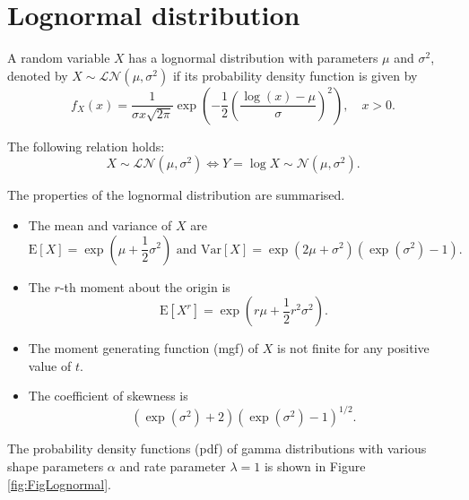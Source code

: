 \documentclass[landscape, 20pt]{extreport}
\theoremstyle{definition}
\theoremstyle{definition}
\theoremstyle{definition}
\theoremstyle{definition}
\theoremstyle{remark}
\begin{document}
\hypertarget{lognormal-distribution}{%
\section{Lognormal distribution}\label{lognormal-distribution}}

A random variable \(X\) has a lognormal distribution with parameters \(\mu\)
and \(\sigma^2\), denoted by \(X \sim \mathcal{LN}(\mu, \sigma^2)\) if its
probability density function is given by
\[f_X(x) = \frac{1}{\sigma x \sqrt{2 \pi}} \exp\left(-\frac{1}{2} \left( \frac{\log(x) - \mu}{\sigma} \right)^2 \right) , \quad x > 0.\]

The following relation holds:
\[X \sim \mathcal{LN}(\mu, \sigma^2)\Leftrightarrow Y = \log X \sim \mathcal{N}(\mu, \sigma^2).\]

The properties of the lognormal distribution are summarised.

\begin{itemize}
\item
  The mean and variance of \(X\) are
  \[\mathrm{E}[X] = \exp\left(\mu + \frac{1}{2} \sigma^2 \right) \text{ and } \mathrm{Var}[X] =\exp\left(2\mu +  \sigma^2 \right) (\exp(\sigma^2) - 1).\]
\item
  The \(r\)-th moment about the origin is
  \[\mathrm{E}[X^r] =\exp\left(r\mu +  \frac{1}{2}r^2 \sigma^2 \right).\]
\item
  The moment generating function (mgf) of \(X\) is not finite for any
  positive value of \(t\).
\item
  The coefficient of skewness is
  \[(\exp(\sigma^2)  + 2) \left(\exp(\sigma^2)  -1 \right)^{1/2} .\]
\end{itemize}

The probability density functions (pdf) of gamma distributions with
various shape parameters \(\alpha\) and rate parameter \(\lambda = 1\) is shown in Figure \ref{fig:FigLognormal}.
\end{document}
